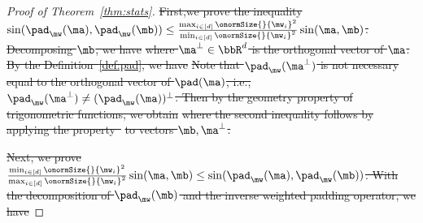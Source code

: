 \documentclass[lettersize,onecolumn,journal]{IEEEtran}
\theoremstyle{definition}
\theoremstyle{definition}
\providecommand{\DIFdeltex}[1]{{\protect\color{red}\sout{#1}}}                      %
\providecommand{\DIFdel}[1]{\texorpdfstring{\DIFdeltex{#1}}{}} %
\begin{document}
\begin{proof}[Proof of Theorem~\ref{thm:stats}]
\DIFdel{First,we prove the inequality $\sin(\pad_{\mw}(\ma),  \pad_{\mw}(\mb)) \leq \frac{ \max_{i \in [d]} \onormSize{}{\mw_i}^2 }{\min_{i \in [d]} \onormSize{}{\mw_i}^2} \sin (\ma, \mb)$. Decomposing $\mb$, we have
}%
\DIFdel{where $\ma^{\perp} \in \bbR^d$ is the orthogonal vector of $\ma$. By the Definition~\ref{def:pad}, we have 
}%
\DIFdel{Note that $\pad_{\mw}(\ma^{\perp})$ is not necessary equal to the orthogonal vector of $\pad(\ma)$, i.e., $\pad_{\mw}(\ma^{\perp}) \neq (\pad_{\mw}(\ma))^{\perp}$. Then by the geometry property of trigonometric functions, we obtain
}%
\DIFdel{where the second inequality follows by applying the property~}%
\DIFdel{to vectors $\mb, \ma^{\perp}$. 
}%

\DIFdel{Next, we prove $\frac{\min_{i \in [d]} \onormSize{}{\mw_i}^2}{\max_{i \in [d]} \onormSize{}{\mw_i}^2 } \sin (\ma, \mb) \leq \sin(\pad_{\mw}(\ma),  \pad_{\mw}(\mb))$. With the decomposition of $\pad_{\mw}(\mb)$ and the inverse weighted padding operator, we have 
}%


\end{proof}
\end{document}
